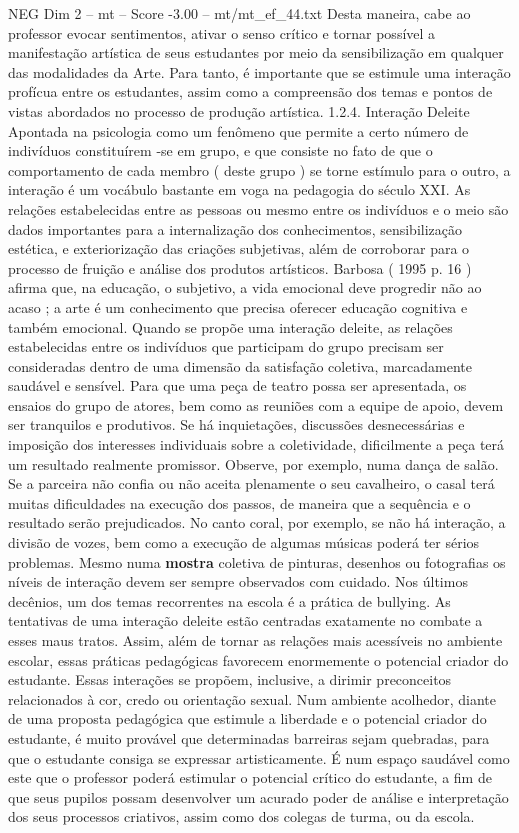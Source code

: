 \begin{textsample}{NEG Dim 2 – mt – Score -3.00 – mt/mt\_ef\_44.txt}
Desta maneira, cabe ao professor evocar sentimentos, ativar o senso crítico e tornar possível a manifestação artística de seus estudantes por meio da sensibilização em qualquer das modalidades da Arte.
Para tanto, é importante que se estimule uma interação profícua entre os estudantes, assim como a compreensão dos temas e pontos de vistas abordados no processo de produção artística. 1.2.4.
Interação Deleite Apontada na psicologia como um fenômeno que permite a certo número de indivíduos constituírem -se em grupo, e que consiste no fato de que o comportamento de cada membro ( deste grupo ) se torne estímulo para o outro, a interação é um vocábulo bastante em voga na pedagogia do século XXI.
As relações estabelecidas entre as pessoas ou mesmo entre os indivíduos e o meio são dados importantes para a internalização dos conhecimentos, sensibilização estética, e exteriorização das criações subjetivas, além de corroborar para o processo de fruição e análise dos produtos artísticos.
Barbosa ( 1995 p. 16 ) afirma que, na educação, o subjetivo, a vida emocional deve progredir não ao acaso ; a arte é um conhecimento que precisa oferecer educação cognitiva e também emocional.
Quando se propõe uma interação deleite, as relações estabelecidas entre os indivíduos que participam do grupo precisam ser consideradas dentro de uma dimensão da satisfação coletiva, marcadamente saudável e sensível.
Para que uma peça de teatro possa ser apresentada, os ensaios do grupo de atores, bem como as reuniões com a equipe de apoio, devem ser tranquilos e produtivos.
Se há inquietações, discussões desnecessárias e imposição dos interesses individuais sobre a coletividade, dificilmente a peça terá um resultado realmente promissor.
Observe, por exemplo, numa dança de salão.
Se a parceira não confia ou não aceita plenamente o seu cavalheiro, o casal terá muitas dificuldades na execução dos passos, de maneira que a sequência e o resultado serão prejudicados.
No canto coral, por exemplo, se não há interação, a divisão de vozes, bem como a execução de algumas músicas poderá ter sérios problemas.
Mesmo numa \textbf{mostra} coletiva de pinturas, desenhos ou fotografias os níveis de interação devem ser sempre observados com cuidado.
Nos últimos decênios, um dos temas recorrentes na escola é a prática de bullying.
As tentativas de uma interação deleite estão centradas exatamente no combate a esses maus tratos.
Assim, além de tornar as relações mais acessíveis no ambiente escolar, essas práticas pedagógicas favorecem enormemente o potencial criador do estudante.
Essas interações se propõem, inclusive, a dirimir preconceitos relacionados à cor, credo ou orientação sexual.
Num ambiente acolhedor, diante de uma proposta pedagógica que estimule a liberdade e o potencial criador do estudante, é muito provável que determinadas barreiras sejam quebradas, para que o estudante consiga se expressar artisticamente.
É num espaço saudável como este que o professor poderá estimular o potencial crítico do estudante, a fim de que seus pupilos possam desenvolver um acurado poder de análise e interpretação dos seus processos criativos, assim como dos colegas de turma, ou da escola.

\end{textsample}
